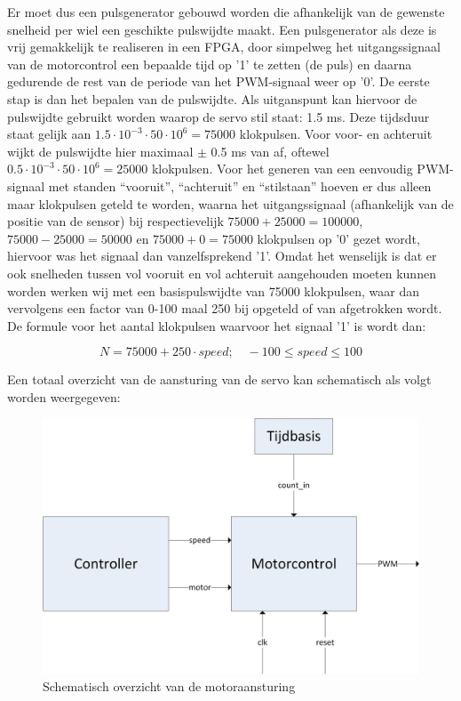 \documentclass{report}
\begin{document}
Er moet dus een pulsgenerator gebouwd worden die afhankelijk van de gewenste snelheid per wiel een geschikte pulswijdte maakt.
Een pulsgenerator als deze is vrij gemakkelijk te realiseren in een FPGA, door simpelweg het uitgangssignaal van de motorcontrol een bepaalde tijd op '1' te zetten (de puls) en daarna gedurende de rest van de periode van het PWM-signaal weer op '0'.
De eerste stap is dan het bepalen van de pulswijdte.
Als uitganspunt kan hiervoor de pulswijdte gebruikt worden waarop de servo stil staat: 1.5 ms.
Deze tijdsduur staat gelijk aan $1.5 \cdot 10^{-3} \cdot 50 \cdot 10^{6} = 75000$ klokpulsen.
Voor voor- en achteruit wijkt de pulswijdte hier maximaal $\pm$ 0.5 ms van af, oftewel $0.5 \cdot 10^{-3} \cdot 50 \cdot 10^{6} = 25000$ klokpulsen.
Voor het generen van een eenvoudig PWM-signaal met standen ``vooruit'', ``achteruit'' en ``stilstaan'' hoeven er dus alleen maar klokpulsen geteld te worden, waarna het uitgangssignaal (afhankelijk van de positie van de sensor) bij respectievelijk $75000 + 25000 = 100000$, $75000 - 25000 = 50000$ en $75000 + 0 = 75000$ klokpulsen op '0' gezet wordt, hiervoor was het signaal dan vanzelfsprekend '1'.
Omdat het wenselijk is dat er ook snelheden tussen vol vooruit en vol achteruit aangehouden moeten kunnen worden werken wij met een basispulswijdte van 75000 klokpulsen, waar dan vervolgens een factor van 0-100 maal 250 bij opgeteld of van afgetrokken wordt.
De formule voor het aantal klokpulsen waarvoor het signaal '1' is wordt dan:

\begin{equation}
	\label{eq:pulsewidth}
	N = 75000 + 250 \cdot speed;\quad -100 \leq speed \leq 100
\end{equation}

Een totaal overzicht van de aansturing van de servo kan schematisch als volgt worden weergegeven:

\begin{figure}[H]
	\includegraphics[width=\textwidth]{resource/motor-control}
	\caption{Schematisch overzicht van de motoraansturing}
	\label{fig:motorcontrol}
\end{figure}
\end{document}
